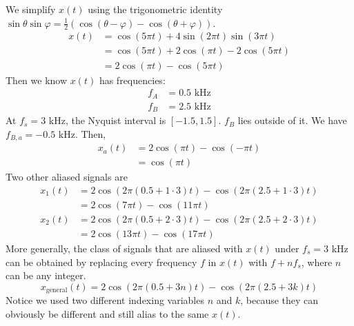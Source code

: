 \begin{itemize}
We simplify $x(t)$ using the trigonometric identity
$\sin\theta\sin\varphi = \frac{1}{2}(\cos(\theta-\varphi)-\cos(\theta+\varphi))$.
\begin{align*}
	x(t) &= \cos(5\pi t) + 4\sin(2\pi t)\sin(3\pi t) \\
		 &= \cos(5\pi t) + 2\cos(\pi t) - 2\cos(5\pi t) \\
		 &= 2\cos(\pi t) - \cos(5\pi t)
\end{align*}
Then we know $x(t)$ has frequencies:
\begin{align*}
	f_A &= 0.5 \text{ kHz} \\
	f_B &= 2.5 \text{ kHz}
\end{align*}
At $f_s = 3$ kHz, the Nyquist interval is $[-1.5,1.5]$. $f_B$ lies outside of it.
We have $f_{B,a} = -0.5$ kHz. Then,
\begin{align*}
	x_a(t) &= 2\cos(\pi t) - \cos(-\pi t) \\
		   &= \cos(\pi t)
\end{align*}
Two other aliased signals are
\begin{align*}
	x_1(t) &= 2\cos(2\pi(0.5+1\cdot 3)t) - \cos(2\pi(2.5+1\cdot 3)t) \\
		   &= 2\cos(7\pi t) - \cos(11\pi t) \\
	x_2(t) &= 2\cos(2\pi(0.5+2\cdot 3)t) - \cos(2\pi(2.5+2\cdot 3)t) \\
		   &= 2\cos(13\pi t) - \cos(17\pi t)
\end{align*}
More generally, the class of signals that are aliased with $x(t)$ under
$f_s = 3$ kHz can be obtained by replacing every frequency $f$ in $x(t)$
with $f + nf_s$, where $n$ can be any integer.
\begin{equation*}
	x_{\text{general}}(t)
	= 2\cos(2\pi(0.5+3n)t) - \cos(2\pi(2.5+3k)t)
\end{equation*}
Notice we used two different indexing variables $n$ and $k$, because
they can obviously be different and still alias to the same $x(t)$.






\end{itemize}
